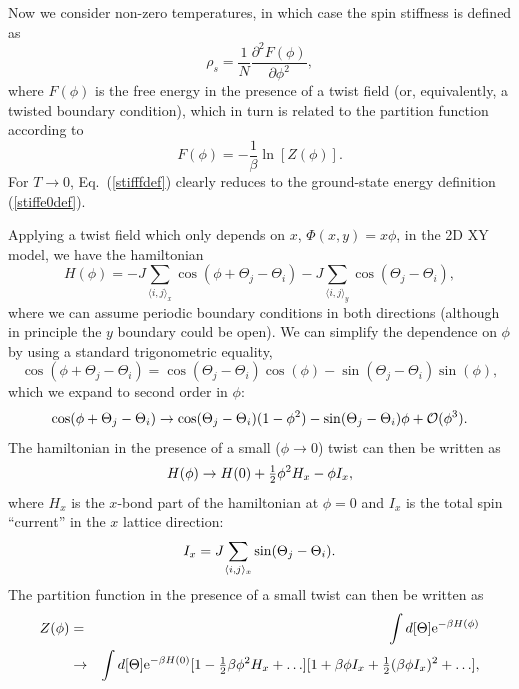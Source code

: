 \documentclass[draft,numberedheadings]{aipproc}
\begin{document}
Now we consider non-zero temperatures, in which case the spin stiffness is defined as
\begin{equation}
\rho_s = \frac{1}{N} \frac{\partial^2 F(\phi)}{\partial \phi^2},
\label{stifffdef}
\end{equation}
where $F(\phi)$ is the free energy in the presence of a twist field (or, equivalently, a twisted boundary condition), which in turn 
is related to the partition function according to
\begin{equation}
F(\phi)=-\frac{1}{\beta}\ln[Z(\phi)].
\label{freeneergyphi}
\end{equation}
For $T \to 0$, Eq.~(\ref{stifffdef}) clearly reduces to the ground-state energy definition (\ref{stiffe0def}).

Applying a twist field which only depends on $x$, $\Phi(x,y)=x\phi$, in the 2D XY model, we have the hamiltonian
\begin{equation}
H(\phi)=-J\sum_{\langle i,j\rangle_x}\cos(\phi+\Theta_j-\Theta_i)-J\sum_{\langle i,j\rangle_y}\cos(\Theta_j-\Theta_i),
\end{equation}
where we can assume periodic boundary conditions in both directions (although in principle the $y$ boundary could be open). We can simplify the 
dependence on $\phi$ by using a standard trigonometric equality,
\begin{equation}
\cos(\phi+\Theta_j-\Theta_i)=\cos(\Theta_j-\Theta_i)\cos(\phi)-\sin(\Theta_j-\Theta_i)\sin(\phi),
\end{equation}
which we expand to second order in $\phi$:
\begin{equation}
\cos(\phi+\Theta_j-\Theta_i) \to \cos(\Theta_j-\Theta_i)(1-\phi^2)-\sin(\Theta_j-\Theta_i)\phi + {\cal O}(\phi^3).
\end{equation}
The hamiltonian in the presence of a small ($\phi \to 0$) twist can then be written as
\begin{equation}
H(\phi) \to H(0) + \hbox{$\frac{1}{2}$}\phi^2H_x -  \phi I_x,
\end{equation}
where $H_x$ is the $x$-bond part of the hamiltonian at $\phi=0$ and $I_x$ is the total spin ``current'' in the $x$ lattice direction:
\begin{equation}
I_x=J\hskip-0.5mm\sum_{\langle i,j\rangle_x}\sin(\Theta_j-\Theta_i).
\label{ixdef}
\end{equation}
The partition function in the presence of a small twist can then be written as
\begin{eqnarray}
Z(\phi) & =   & \int d[\Theta]{\rm e}^{-\beta H(\phi)} \\
        & \to & \int d[\Theta]{\rm e}^{-\beta H(0)} [1-\hbox{$\frac{1}{2}$}\beta\phi^2H_x+\ldots]
                 [1 + \beta \phi I_x + \hbox{$\frac{1}{2}$}(\beta\phi I_x)^2+\ldots],\nonumber
\end{eqnarray}
\end{document}

